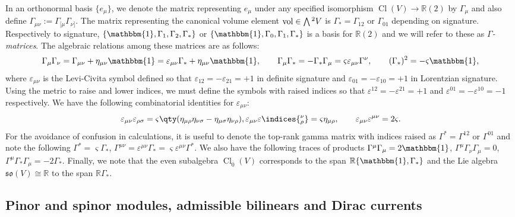 \documentclass[10pt,a4paper]{amsart}
\numberwithin{equation}{section}
\newcommand{\fso}{\mathfrak{so}}
\newcommand{\RR}{\mathbb{R}}
\newcommand{\Wedge}{\mathchoice{{\textstyle\bigwedge}}{\bigwedge}{\bigwedge}{\bigwedge}}	%
\newcommand{\1}{\mathbbm{1}}
\DeclareMathOperator{\Cl}{Cl}
\DeclareMathOperator{\vol}{vol}
\begin{document}
In an orthonormal basis $\{e_\mu\}$, we denote the matrix representing $e_\mu$ under any specified isomorphism $\Cl(V)\to\RR(2)$ by $\Gamma_\mu$ and also define $\Gamma_{\mu\nu}:=\Gamma_{[\mu}\Gamma_{\nu]}$. The matrix representing the canonical volume element $\vol\in\Wedge^2 V$ is $\Gamma_*=\Gamma_{12}$ or $\Gamma_{01}$ depending on signature. Respectively to signature, $\{\1,\Gamma_1,\Gamma_2,\Gamma_*\}$ or $\{\1,\Gamma_0,\Gamma_1,\Gamma_*\}$ is a basis for $\RR(2)$ and we will refer to these as \emph{$\Gamma$-matrices}. The algebraic relations among these matrices are as follows:
\[
	\Gamma_{\mu}\Gamma_{\nu} = \Gamma_{\mu\nu} + \eta_{\mu\nu}\1 = \varepsilon_{\mu\nu}\Gamma_* + \eta_{\mu\nu}\1,
	\qquad	\Gamma_\mu \Gamma_* = -\Gamma_* \Gamma_\mu = \varsigma \varepsilon_{\mu\nu}\Gamma^\nu,
	\qquad (\Gamma_*)^2 = -\varsigma\1,
\]
where $\varepsilon_{\mu\nu}$ is the Levi-Civita symbol defined so that $\varepsilon_{12}=-\varepsilon_{21}=+1$ in definite signature and $\varepsilon_{01}=-\varepsilon_{10}=+1$ in Lorentzian signature. Using the metric to raise and lower indices, we must define the symbols with raised indices so that $\varepsilon^{12}=-\varepsilon^{21}=+1$ and $\varepsilon^{01}=-\varepsilon^{10}=-1$ respectively. We have the following combinatorial identities for $\varepsilon_{\mu\nu}$:
\[
	\varepsilon_{\mu\nu}\varepsilon_{\rho\sigma}
		= \varsigma\qty(\eta_{\mu\rho}\eta_{\nu\sigma} - \eta_{\mu\sigma}\eta_{\nu\rho}),
	\varepsilon_{\mu\nu}\varepsilon\indices{_\rho^\nu}
		= \varsigma\eta_{\mu\rho},\qquad
	\varepsilon_{\mu\nu}\varepsilon^{\mu\nu} = 2\varsigma.
\]
For the avoidance of confusion in calculations, it is useful to denote the top-rank gamma matrix with indices raised as $\Gamma^*=\Gamma^{12}$ or $\Gamma^{01}$ and note the following
$\Gamma^* = \varsigma\Gamma_*$,
$\Gamma^{\mu\nu} = \varepsilon^{\mu\nu}\Gamma_* = \varsigma\varepsilon^{\mu\nu}\Gamma^*$.
We also have the following traces of products
$\Gamma^\mu\Gamma_\mu = 2\1$, $
	\Gamma^\mu\Gamma_\nu\Gamma_\mu = 0$, $
	\Gamma^\mu\Gamma_*\Gamma_\mu = -2\Gamma_*$.
Finally, we note that the even subalgebra $\Cl_{\overline 0}(V)$ corresponds to the span $\RR\{\1,\Gamma_*\}$ and the Lie algebra~${\fso(V)\cong\RR}$ to the span $\RR\Gamma_*$.

\subsection{Pinor and spinor modules, admissible bilinears and Dirac currents}
\label{sec:2d-dirac-currents}
\end{document}
